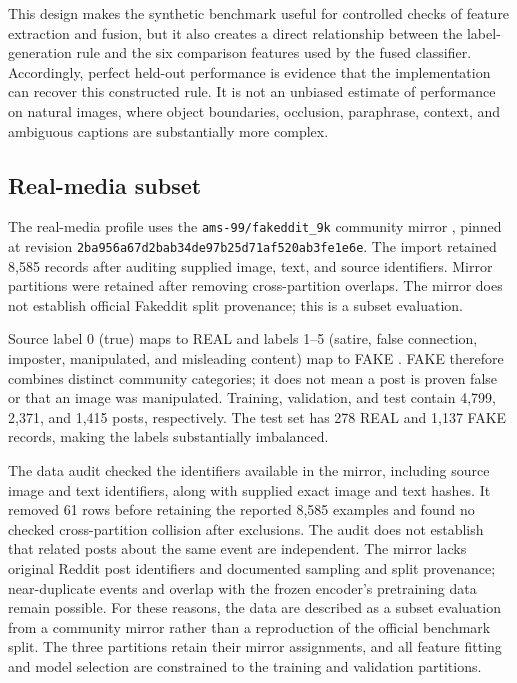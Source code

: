 \documentclass[conference]{IEEEtran}
\begin{document}
This design makes the synthetic benchmark useful for controlled checks of feature extraction and fusion, but it also creates a direct relationship between the label-generation rule and the six comparison features used by the fused classifier. Accordingly, perfect held-out performance is evidence that the implementation can recover this constructed rule. It is not an unbiased estimate of performance on natural images, where object boundaries, occlusion, paraphrase, context, and ambiguous captions are substantially more complex.
\subsection{Real-media subset}
The real-media profile uses the \texttt{ams-99/fakeddit\_9k} community mirror \cite{mirror}, pinned at revision \texttt{2ba956a67d2bab34de97b25d71af520ab3fe1e6e}. The import retained 8,585 records after auditing supplied image, text, and source identifiers. Mirror partitions were retained after removing cross-partition overlaps. The mirror does not establish official Fakeddit split provenance; this is a subset evaluation.

Source label 0 (true) maps to REAL and labels 1--5 (satire, false connection, imposter, manipulated, and misleading content) map to FAKE \cite{labelmap}. FAKE therefore combines distinct community categories; it does not mean a post is proven false or that an image was manipulated. Training, validation, and test contain 4,799, 2,371, and 1,415 posts, respectively. The test set has 278 REAL and 1,137 FAKE records, making the labels substantially imbalanced.

The data audit checked the identifiers available in the mirror, including source image and text identifiers, along with supplied exact image and text hashes. It removed 61 rows before retaining the reported 8,585 examples and found no checked cross-partition collision after exclusions. The audit does not establish that related posts about the same event are independent. The mirror lacks original Reddit post identifiers and documented sampling and split provenance; near-duplicate events and overlap with the frozen encoder's pretraining data remain possible. For these reasons, the data are described as a subset evaluation from a community mirror rather than a reproduction of the official benchmark split. The three partitions retain their mirror assignments, and all feature fitting and model selection are constrained to the training and validation partitions.
\end{document}

